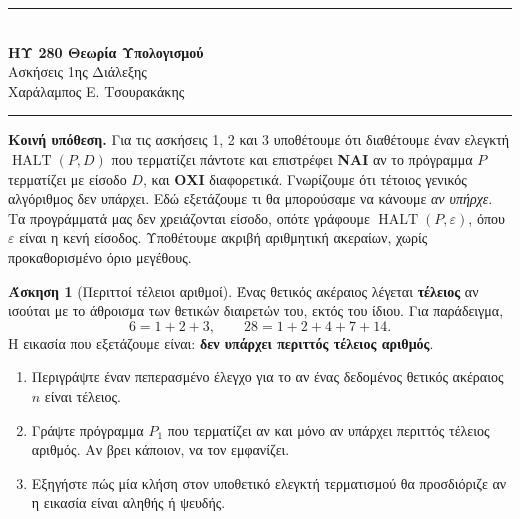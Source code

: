 \documentclass[11pt,a4paper]{article}
\newcommand{\horrule}[1]{\rule{\linewidth}{#1}}
\theoremstyle{definition}
\newtheorem{question}{Άσκηση}
\newcommand{\HALT}{\operatorname{HALT}}
\begin{document}
\begin{center}
\horrule{0.4pt}\\[0.15cm]
{\large\textbf{ΗΥ 280 \textemdash{} Θεωρία Υπολογισμού}}\\[0.1cm]
{Ασκήσεις 1ης Διάλεξης }\\[0.1cm]
{Χαράλαμπος Ε. Τσουρακάκης}\\
\horrule{0.4pt}
\end{center}

\textbf{Κοινή υπόθεση.}
Για τις ασκήσεις 1, 2 και 3 υποθέτουμε ότι διαθέτουμε έναν ελεγκτή
$\HALT(P,D)$ που τερματίζει πάντοτε και επιστρέφει \textbf{ΝΑΙ}
αν το πρόγραμμα $P$ τερματίζει με είσοδο $D$, και \textbf{ΟΧΙ} διαφορετικά.
Γνωρίζουμε ότι τέτοιος γενικός αλγόριθμος δεν υπάρχει.
Εδώ εξετάζουμε τι θα μπορούσαμε να κάνουμε \emph{αν υπήρχε}.
Τα προγράμματά μας δεν χρειάζονται είσοδο, οπότε γράφουμε
$\HALT(P,\varepsilon)$, όπου $\varepsilon$ είναι η κενή είσοδος.
Υποθέτουμε ακριβή αριθμητική ακεραίων, χωρίς προκαθορισμένο όριο μεγέθους.

\begin{question}[Περιττοί τέλειοι αριθμοί]
Ένας θετικός ακέραιος λέγεται \textbf{τέλειος} αν ισούται με το άθροισμα
των θετικών διαιρετών του, εκτός του ίδιου. Για παράδειγμα,
\[
6=1+2+3,\qquad 28=1+2+4+7+14.
\]
Η εικασία που εξετάζουμε είναι: \textbf{δεν υπάρχει περιττός τέλειος αριθμός}.
\begin{enumerate}
\item Περιγράψτε έναν πεπερασμένο έλεγχο για το αν ένας δεδομένος θετικός
ακέραιος $n$ είναι τέλειος.
\item Γράψτε πρόγραμμα $P_1$ που τερματίζει αν και μόνο αν υπάρχει
περιττός τέλειος αριθμός. Αν βρει κάποιον, να τον εμφανίζει.
\item Εξηγήστε πώς μία κλήση στον υποθετικό ελεγκτή τερματισμού
θα προσδιόριζε αν η εικασία είναι αληθής ή ψευδής.
\end{enumerate}
\end{question}
\end{document}
